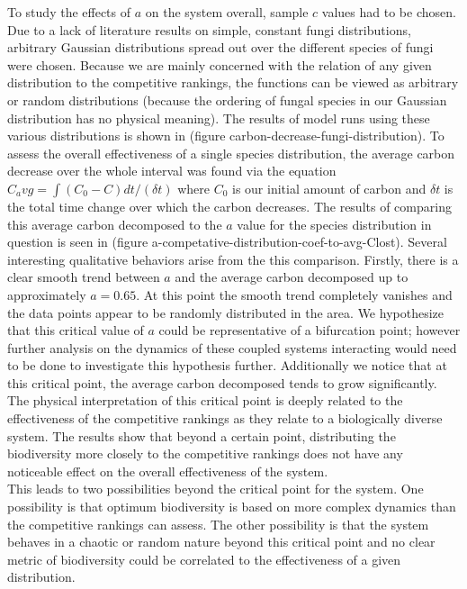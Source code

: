 \documentclass[12pt]{article}
\begin{document}
\begin{multicols}{2}
To study the effects of $a$ on the system overall, sample $c$ values had to be chosen. Due to a lack of literature results on simple, constant fungi distributions, arbitrary Gaussian distributions spread out over the different species of fungi were chosen. Because we are mainly concerned with the relation of any given distribution to the competitive rankings, the functions can be viewed as arbitrary or random distributions (because the ordering of fungal species in our Gaussian distribution has no physical meaning). The results of model runs using these various distributions is shown in (figure carbon-decrease-fungi-distribution). To assess the overall effectiveness of a single species distribution, the average carbon decrease over the whole interval was found via the equation $C_avg = \int (C_{0}-C)dt/(\delta t)$ where $C_{0}$ is our initial amount of carbon and $\delta t$ is the total time change over which the carbon decreases. The results of comparing this average carbon decomposed to the $a$ value for the species distribution in question is seen in (figure a-competative-distribution-coef-to-avg-Clost). Several interesting qualitative behaviors arise from the this comparison. Firstly, there is a clear smooth trend between $a$ and the average carbon decomposed up to approximately $a=0.65$. At this point the smooth trend completely vanishes and the data points appear to be randomly distributed in the area. We hypothesize that this critical value of $a$ could be representative of a bifurcation point; however further analysis on the dynamics of these coupled systems interacting would need to be done to investigate this hypothesis further. Additionally we notice that at this critical point, the average carbon decomposed tends to grow significantly. The physical interpretation of this critical point is deeply related to the effectiveness of the competitive rankings as they relate to a biologically diverse system. The results show that beyond a certain point, distributing the biodiversity more closely to the competitive rankings does not have any noticeable effect on the overall effectiveness of the system. \\
This leads to two possibilities beyond the critical point for the system. One possibility is that optimum biodiversity is based on more complex dynamics than the competitive rankings can assess. The other possibility is that the system behaves in a chaotic or random nature beyond this critical point and no clear metric of biodiversity could be correlated to the effectiveness of a given distribution.



\end{multicols}
\end{document}
